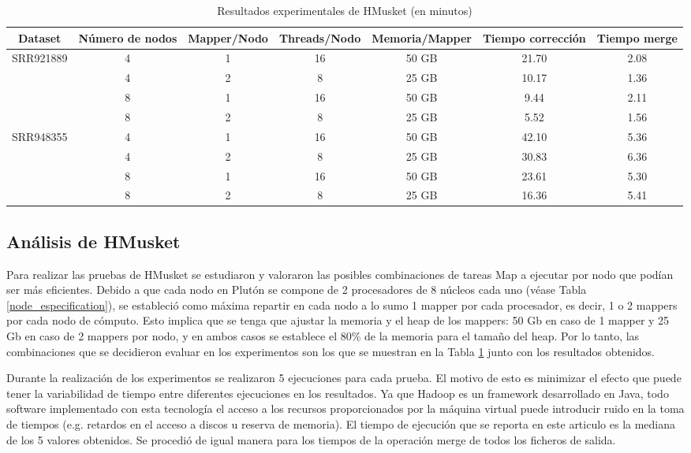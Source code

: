 \documentclass[conference]{IEEEtran}
\begin{document}
\begin{table}[]
	\caption{Resultados experimentales de HMusket (en minutos)}
	\begin{tabular}{|c|c|c|c|c|c|c|}
		\hline
		\textbf{Dataset} &	\textbf{Número de nodos} & \textbf{Mapper/Nodo} & \textbf{Threads/Nodo} & \textbf{Memoria/Mapper} & \textbf{Tiempo corrección} & \textbf{Tiempo merge}	\\ \hline
		\multirow{ 4}{*}{SRR921889} &	4 & 1 & 16 & 50 GB & 21.70	& 2.08	\\ \cline{2-7}
									&	4 & 2 & 8 & 25 GB  & 10.17	& 1.36	\\ \cline{2-7}
									&	8 & 1 & 16 & 50 GB & 9.44	& 2.11	\\ \cline{2-7}
									&	8 & 2 & 8 & 25 GB  & 5.52	& 1.56	\\ \hline \hline
									
		\multirow{ 4}{*}{SRR948355} &	4 & 1 & 16 & 50 GB & 42.10	& 5.36	\\ \cline{2-7}
									&	4 & 2 & 8 & 25 GB  & 30.83	& 6.36	\\ \cline{2-7}
									&	8 & 1 & 16 & 50 GB & 23.61	& 5.30	\\ \cline{2-7}
									&	8 & 2 & 8 & 25 GB  & 16.36	& 5.41 \\ \hline
	\end{tabular}
	\label{hmusket_experiment_result}
\end{table}

\subsection{Análisis de HMusket}
Para realizar las pruebas de HMusket se estudiaron y valoraron las posibles combinaciones de tareas Map a ejecutar por nodo que podían ser más eficientes. Debido a que cada nodo en Plutón se compone de 2 procesadores de 8 núcleos cada uno (véase Tabla \ref{node_especification}), se estableció como máxima repartir en cada nodo a lo sumo 1 mapper por cada procesador, es decir, 1 o 2 mappers por cada nodo de cómputo. Esto implica que se tenga que ajustar la memoria y el heap de los mappers: 50 Gb en caso de 1 mapper y 25 Gb en caso de 2 mappers por nodo, y en ambos casos se establece el 80\% de la memoria para el tamaño del heap. Por lo tanto, las combinaciones que se decidieron evaluar en los experimentos son los que se muestran en la Tabla \ref{hmusket_experiment_result} junto con los resultados obtenidos.

Durante la realización de los experimentos se realizaron 5 ejecuciones para cada prueba. El motivo de esto es minimizar el efecto que puede tener la variabilidad de tiempo entre diferentes ejecuciones en los resultados. Ya que Hadoop es un framework desarrollado en Java, todo software implementado con esta tecnología el acceso a los recursos proporcionados por la máquina virtual puede introducir ruido en la toma de tiempos (e.g. retardos en el acceso a discos u reserva de memoria). El tiempo de ejecución que se reporta en este articulo es la mediana de los 5 valores obtenidos. Se procedió de igual manera para los tiempos de la operación merge de todos los ficheros de salida.
\end{document}

